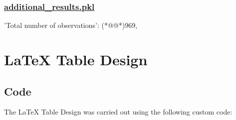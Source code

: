 \documentclass[11pt]{article}
\begin{document}
\subsubsection*{\hyperlink{code-Data Analysis-additional-results-pkl}{additional\_results.pkl}}

\begin{codeoutput}
{
    'Total number of observations': (*@@*)969,
}
\end{codeoutput}

\section{LaTeX Table Design}
\subsection{{Code}}
The LaTeX Table Design was carried out using the following custom code:
\end{document}
